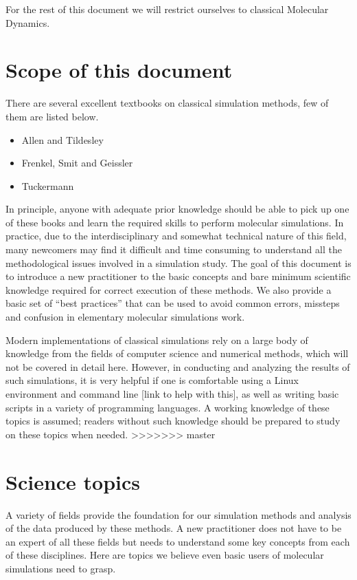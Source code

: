 \documentclass[9pt,bestpractices]{livecoms}
\begin{document}
For the rest of this document we will restrict ourselves to classical Molecular
Dynamics.

\section{Scope of this document}
\label{sec:scope}
There are several excellent textbooks on classical simulation methods, few of
them are listed below.

\begin{itemize}
\item Allen and Tildesley
\item Frenkel, Smit and Geissler
\item Tuckermann
\end{itemize}

In principle, anyone with adequate prior knowledge should be able to pick up one
of these books and learn the required skills to perform molecular simulations.
In practice, due to the interdisciplinary and somewhat technical nature of this
field, many newcomers may find it difficult and time consuming to understand all
the methodological issues involved in a simulation study.   The goal of this
document is to introduce a new practitioner to the basic concepts and bare
minimum scientific knowledge required for correct execution of these methods. We
also provide a basic set of “best practices” that can be used to avoid common
errors, missteps and confusion in elementary molecular simulations work.

Modern implementations of classical simulations rely on a large body of
knowledge from the fields of computer science and numerical methods, which will
not be covered in detail here. However, in conducting and analyzing the results
of such simulations, it is very helpful if one is comfortable using a Linux
environment and command line [link to help with this], as well as writing basic
scripts in a variety of programming languages. A working knowledge of these
topics is assumed; readers without such knowledge should be prepared to study on
these topics when needed.
>>>>>>> master



\section{Science topics}
\label{sec:science}
A variety of fields provide the foundation for our simulation methods and
analysis of the data produced by these methods. A new practitioner does not have
to be an expert of all these fields but needs to understand some key concepts
from each of these disciplines. Here are topics we believe even basic users of
molecular simulations need to grasp.
\end{document}
